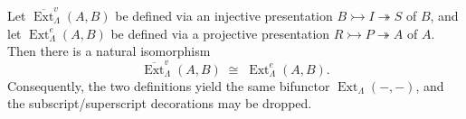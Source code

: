 Let $\overline{\operatorname{Ext}}_{\Lambda}^{v}(A, B)$ be defined via an injective presentation $B \rightarrowtail I \twoheadrightarrow S$ of $B$, and let $\operatorname{Ext}_{\Lambda}^{e}(A, B)$ be defined via a projective presentation $R \rightarrowtail P \twoheadrightarrow A$ of $A$. Then there is a natural isomorphism
$$\overline{\operatorname{Ext}}_{\Lambda}^{v}(A, B) \;\cong\; \operatorname{Ext}_{\Lambda}^{e}(A, B).$$
Consequently, the two definitions yield the same bifunctor $\operatorname{Ext}_{\Lambda}(-, -)$, and the subscript/superscript decorations may be dropped.
